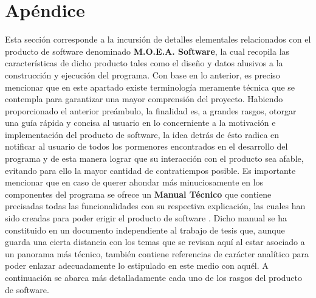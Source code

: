 \documentclass[class=report, crop=false]{standalone}
\begin{document}
\chapter*{Apéndice}


\label{sec:c1_1}

Esta sección corresponde a la incursión de detalles elementales 
relacionados con el producto de software denominado \textbf{M.O.E.A. Software}, 
la cual recopila las características de dicho producto tales 
como el diseño y datos alusivos a la construcción y ejecución 
del programa.\break
Con base en lo anterior, es preciso mencionar que en este 
apartado existe terminología meramente técnica que se contempla 
para garantizar una mayor comprensión del proyecto.\medskip\break
Habiendo proporcionado el anterior preámbulo, la finalidad es, 
a grandes rasgos, otorgar una guía rápida y concisa al usuario 
en lo concerniente a la motivación e implementación del producto 
de software, la idea detrás de ésto radica en notificar al usuario 
de todos los pormenores encontrados en el desarrollo del programa 
y de esta manera lograr que su interacción con el producto sea 
afable, evitando para ello la mayor cantidad de contratiempos 
posible.\medskip\break
Es importante mencionar que en caso de querer ahondar más 
minuciosamente en los componentes del programa se ofrece un 
\textbf{Manual Técnico} que contiene precisadas todas las funcionalidades 
con su respectiva explicación, las cuales han sido creadas para 
poder erigir el producto de software .\break
Dicho manual se ha constituido en un documento independiente al 
trabajo de tesis que, aunque guarda una cierta distancia con los 
temas que se revisan aquí al estar asociado a un panorama más 
técnico, también contiene referencias de carácter analítico para 
poder enlazar adecuadamente lo estipulado en este medio con aquél.\medskip\break
A continuación se abarca más detalladamente cada uno de los rasgos 
del producto de software.
\end{document}
